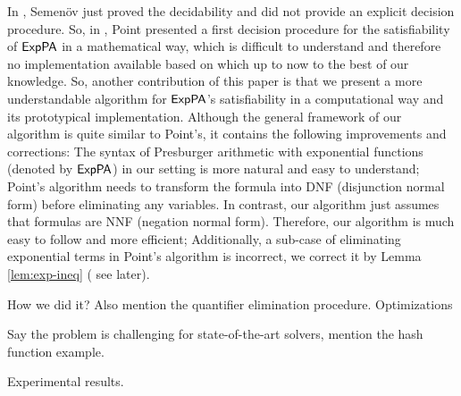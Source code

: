 In \cite{Semenov84}, Semen\"{o}v just proved the decidability and did not provide an explicit decision procedure. So, in  \cite{Point86}, Point presented a first decision procedure for the satisfiability of ${\sf ExpPA}$ in a mathematical way, which is difficult to understand and therefore no implementation available based on which up to now to the best of our knowledge. So, another contribution of this paper is that we present a more understandable algorithm for ${\sf ExpPA}$'s satisfiability in a computational way and its prototypical implementation. Although the general framework of our algorithm is quite similar to Point's,  it contains the following improvements and corrections: 
   The syntax of Presburger arithmetic with exponential functions (denoted by ${\sf ExpPA}$) in our setting is more natural and easy to understand; Point's algorithm needs to transform the formula into DNF (disjunction normal form) before  eliminating any variables. In contrast, our algorithm just assumes that formulas are NNF (negation normal form). Therefore, our algorithm is much easy to follow and more efficient; Additionally, a sub-case of eliminating exponential terms in Point's algorithm is incorrect, we correct it by Lemma \ref{lem:exp-ineq} ( see later).

How we did it? Also mention the quantifier elimination procedure. Optimizations

Say the problem is challenging for state-of-the-art solvers, mention the hash function example.

Experimental results.
